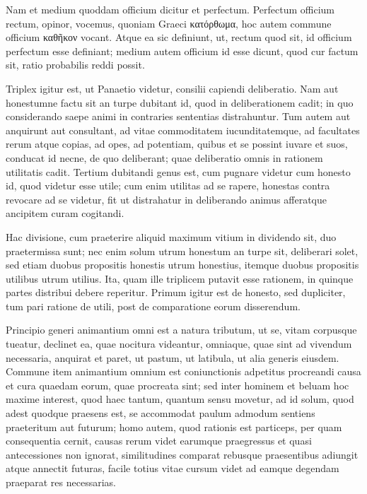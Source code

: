  Nam et medium quoddam officium dicitur et perfectum. Perfectum officium rectum, opinor, vocemus, quoniam Graeci \textgreek{κατόρθωμα}, hoc autem commune officium \textgreek{καθῆκον} vocant. Atque ea sic definiunt, ut, rectum quod sit, id officium perfectum esse definiant; medium autem officium id esse dicunt, quod cur factum sit, ratio probabilis reddi possit.

 

 Triplex igitur est, ut Panaetio videtur, consilii capiendi deliberatio. Nam aut honestumne factu sit an turpe dubitant id, quod in deliberationem cadit; in quo considerando saepe animi in contraries sententias distrahuntur. Tum autem aut anquirunt aut consultant, ad vitae commoditatem iucunditatemque, ad facultates rerum atque copias, ad opes, ad potentiam, quibus et se possint iuvare et suos, conducat id necne, de quo deliberant; quae deliberatio omnis in rationem utilitatis cadit. Tertium dubitandi genus est, cum pugnare videtur cum honesto id, quod videtur esse utile; cum enim utilitas ad se rapere, honestas contra revocare ad se videtur, fit ut distrahatur in deliberando animus afferatque ancipitem curam cogitandi.
 

 Hac divisione, cum praeterire aliquid maximum vitium in dividendo sit, duo praetermissa sunt; nec enim solum utrum honestum an turpe sit, deliberari solet, sed etiam duobus propositis honestis utrum honestius, itemque duobus propositis utilibus utrum utilius. Ita, quam ille triplicem putavit esse rationem, in quinque partes distribui debere reperitur. Primum igitur est de honesto, sed dupliciter, tum pari ratione de utili, post de comparatione eorum disserendum.

 

 Principio generi animantium omni est a natura tributum, ut se, vitam corpusque tueatur, declinet ea, quae nocitura videantur, omniaque, quae sint ad vivendum necessaria, anquirat et paret, ut pastum, ut latibula, ut alia generis eiusdem. Commune item animantium omnium est coniunctionis adpetitus procreandi causa et cura quaedam eorum, quae procreata sint; sed inter hominem et beluam hoc maxime interest, quod haec tantum, quantum sensu movetur, ad id solum, quod adest quodque praesens est, se accommodat paulum admodum sentiens praeteritum aut futurum; homo autem, quod rationis est particeps, per quam consequentia cernit, causas rerum videt earumque praegressus et quasi antecessiones non ignorat, similitudines comparat rebusque praesentibus adiungit atque annectit futuras, facile totius vitae cursum videt ad eamque degendam praeparat res necessarias.


